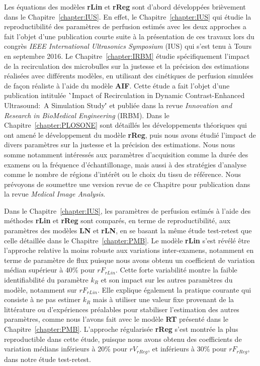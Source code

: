 \begin{otherlanguage}{francais}
Les \'equations des mod\`eles \textbf{rLin} et \textbf{rReg} sont d'abord d\'evelopp\'ees bri\`evement dans le Chapitre~\ref{chapter:IUS}.
En effet, le Chapitre~\ref{chapter:IUS} qui \'etudie la reproductibilit\'e des param\`etres de perfusion estim\'es avec les deux approches a fait l'objet d'une publication courte suite \`a la pr\'esentation de ces travaux lors du congr\`es {\em IEEE International Ultrasonics Symposium} (IUS) qui s'est tenu \`a Tours en septembre 2016.
Le Chapitre~\ref{chapter:IRBM} \'etudie sp\'ecifiquement l'impact de la recirculation des microbulles sur la justesse et la pr\'ecision des estimations r\'ealis\'ees avec diff\'erents mod\`eles, en utilisant des cin\'etiques de perfusion simul\'ees de fa\c{c}on r\'ealiste  \`a l'aide du mod\`ele \textbf{AIF}.
Cette \'etude a fait l'objet d'une publication intitul\'ee \``Impact of Recirculation in Dynamic Contrast-Enhanced Ultrasound:~A Simulation Study\'' et publi\'ee dans la revue {\em Innovation and Research in BioMedical Engineering} (IRBM).
Dans le Chapitre~\ref{chapter:PLOSONE} sont d\'etaill\'es les d\'eveloppements th\'eoriques qui ont amen\'e le d\'eveloppement du mod\`ele \textbf{rReg}, puis nous avons \'etudi\'e l'impact de divers param\`etres sur la justesse et la pr\'ecision des estimations.
Nous nous somme notamment int\'eress\'es aux param\`etres d'acquisition comme la dur\'ee des examens ou la fr\'equence d'\'echantillonage, mais aussi \`a des strat\'egies d'analyse comme le nombre de r\'egions d'int\'er\^et ou le choix du tissu de r\'ef\'erence.
Nous pr\'evoyons de soumettre une version revue de ce Chapitre pour publication dans la revue {\em Medical Image Analysis}.

Dans le Chapitre~\ref{chapter:IUS}, les param\`etres de perfusion estim\'es \`a l'aide des m\'ethodes \textbf{rLin} et \textbf{rReg} sont compar\'es, en terme de reproductibilit\'e, aux param\`etres des mod\`eles \textbf{LN} et \textbf{rLN}, en se basant la m\^eme \'etude test-retest que celle d\'etaill\'ee dans le Chapitre~\ref{chapter:PMB}.
Le mod\`ele \textbf{rLin} s'est r\'ev\'el\'e \^etre l'approche relative la moins robuste aux variations inter-examens, notamment en terme de param\`etre de flux puisque nous avons obtenu un coefficient de variation m\'edian sup\'erieur \`a 40\% pour $rF_{rLin}$.
Cette forte variabilit\'e montre la faible identifiabilit\'e du param\`etre $k_R$ et son impact sur les autres param\`etres du mod\`ele, notamment sur $rF_{rLin}$.
Elle explique \'egalement la pratique courante qui consiste \`a ne pas estimer $k_R$ mais \`a utiliser une valeur fixe provenant de la litt\'erature ou d'exp\'eriences pr\'ealables pour stabiliser l'estimation des autres param\`etres, comme nous l'avons fait avec le mod\`ele \textbf{RT} pr\'esent\'e dans le Chapitre~\ref{chapter:PMB}.
L'approche r\'egularis\'ee \textbf{rReg} s'est montr\'ee la plus reproductible dans cette \'etude, puisque nous avons obtenu des coefficients de variation m\'edians inf\'erieurs \`a 20\% pour $rV_{rReg}$, et inf\'erieurs \`a 30\% pour $rF_{rReg}$, dans notre \'etude test-retest.


\end{otherlanguage}
